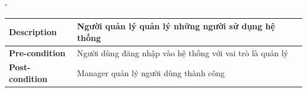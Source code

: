 \begin {list} {-}{}
\begin{itemize}
\begin{table}[H]
\begin{tabular}{|l|l|}
            \textbf{Description}      & Người quản lý quản lý những người sử dụng hệ thống                                                                                                                                                                                                                                                                                                                                                                                                                                                                                                                                                                                      \\ \hline
            \textbf{Pre-condition}    & Người dùng đăng nhập vào hệ thống với vai trò là quản lý                                                                                                                                                                                                                                                                                                                                                                                                                                                                                                                                                                                \\ \hline
            \textbf{Post-condition}   & Manager quản lý người dùng thành công                                                                                                                                                                                                                                                                                                                                                                                                                                                                                                                                                                                                   \\ \hline

\end{tabular}
\end{table}
\end{itemize}
\end{list}
